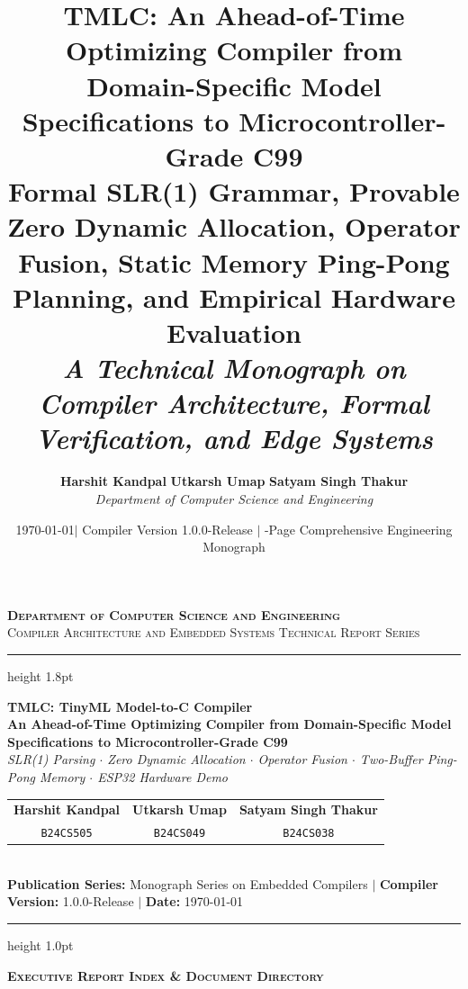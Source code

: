 \documentclass[11pt,a4paper]{article}
\title{
    \vspace{-1.5cm}
    \textbf{\huge TMLC: An Ahead-of-Time Optimizing Compiler from Domain-Specific Model Specifications to Microcontroller-Grade C99} \\[0.6em]
    \large\textbf{Formal SLR(1) Grammar, Provable Zero Dynamic Allocation, Operator Fusion, Static Memory Ping-Pong Planning, and Empirical Hardware Evaluation} \\[0.4em]
    \normalsize\textit{A Technical Monograph on Compiler Architecture, Formal Verification, and Edge Systems}
}
\author{
    \textbf{Harshit Kandpal} \qquad \textbf{Utkarsh Umap} \qquad \textbf{Satyam Singh Thakur} \\[0.4em]
    \textit{Department of Computer Science and Engineering}
}
\date{\today \quad $\vert$ \quad Compiler Version 1.0.0-Release \quad $\vert$ \quad 60-Page Comprehensive Engineering Monograph}
\begin{document}
\begin{titlepage}
\thispagestyle{empty}
\begin{center}
    {\large \textsc{\textbf{Department of Computer Science and Engineering}}}\\[0.25em]
    {\normalsize \textsc{Compiler Architecture and Embedded Systems Technical Report Series}}\\[0.6em]
    \hrule height 1.8pt
    \vspace{0.8em}
    
    {\Huge \textbf{TMLC: TinyML Model-to-C Compiler}}\\[0.45em]
    {\large \textbf{An Ahead-of-Time Optimizing Compiler from Domain-Specific Model Specifications to Microcontroller-Grade C99}}\\[0.35em]
    {\small \textit{SLR(1) Parsing $\cdot$ Zero Dynamic Allocation $\cdot$ Operator Fusion $\cdot$ Two-Buffer Ping-Pong Memory $\cdot$ ESP32 Hardware Demo}}\\[1.1em]
    
    \begin{tabular}{ccc}
        \textbf{Harshit Kandpal} & \textbf{Utkarsh Umap} & \textbf{Satyam Singh Thakur} \\
        \texttt{B24CS505} & \texttt{B24CS049} & \texttt{B24CS038} \\
    \end{tabular}\\[0.65em]
    {\footnotesize \textbf{Publication Series:} Monograph Series on Embedded Compilers \quad $\vert$ \quad \textbf{Compiler Version:} 1.0.0-Release \quad $\vert$ \quad \textbf{Date:} \today}
\end{center}

\vspace{0.5em}
\hrule height 1.0pt
\vspace{0.8em}

\begin{center}
    {\large \textbf{\textsc{Executive Report Index \& Document Directory}}}
\end{center}
\vspace{0.2em}


\end{titlepage}
\end{document}
